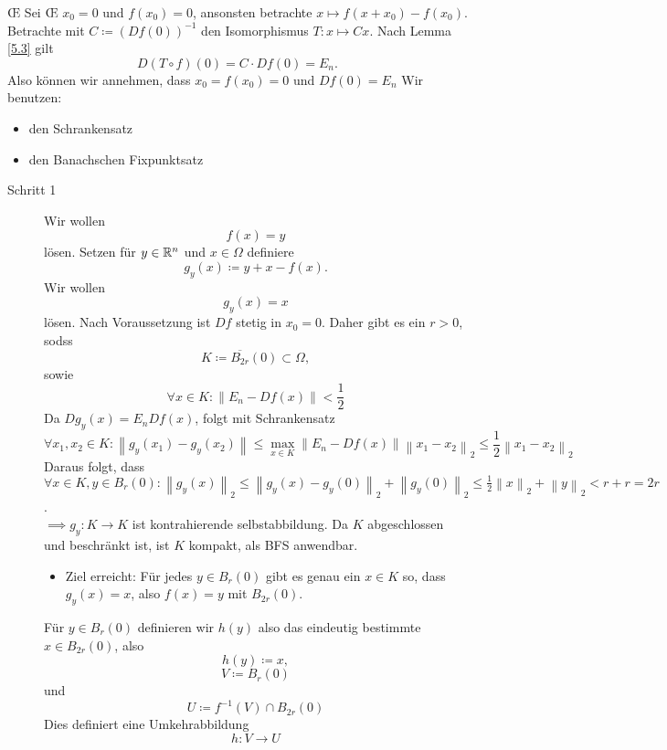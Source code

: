 \begin{proof*}
	\OE{} Sei \OE{} $ x_0 = 0 $ und $ f(x_0) = 0 $, ansonsten betrachte $ x \mapsto f\left( x + x_0 \right) - f(x_0) $.
	Betrachte mit $ C \coloneqq \left( Df(0) \right) ^{-1}  $ den Isomorphismus $ T : x \mapsto Cx $.
	Nach Lemma \ref{5.3} gilt
	\[
		D\left( T \circ f \right) \left( 0 \right) = C \cdot Df(0) = E_n.
	\]
	Also können wir annehmen, dass $ x_0 = f(x_0) = 0 $ und $ Df(0) = E_n $
	Wir benutzen:
	\begin{itemize}
		\item den Schrankensatz
		\item den Banachschen Fixpunktsatz
	\end{itemize}
	\begin{description}
		\item[Schritt 1] Wir wollen
			\[
				f(x) = y
			\]
			lösen.
			Setzen für $ y \in \mathbb{R} ^n $ und $ x \in \Omega $ 
			definiere
			\[
				g_y (x) \coloneqq y + x - f(x).
			\]
			Wir wollen
			\[
				g_y(x) = x
			\]
			lösen.
			Nach Voraussetzung ist $ Df $ stetig in $ x_0 = 0 $. Daher gibt es ein $ r> 0 $, sodss
			\[
				K \coloneqq \overline{B_{2r}}(0) \subset \Omega,
			\]
			sowie
			\[
				\forall x \in K : \left\| E_n - Df(x) \right\| < \frac{ 1 }{ 2 } 
			\]
			Da $ Dg_y(x) = E_n Df(x) $, folgt mit Schrankensatz
			\[
				\forall x_1, x_2 \in K : \left\| g_y(x_1) - g_y(x_2) \right\| \leq \max_{x \in K} \left\| E_n - Df(x) \right\| \left\| x_1 - x_2 \right\| _2 \leq  \frac{ 1 }{ 2 } \left\| x_1 - x_2 \right\| _2
			\]
			Daraus folgt, dass $ \forall x \in K, y \in B_{r}(0) : \left\| g_y (x) \right\| _2 \leq \left\| g_y(x) - g_y(0) \right\| _2 + \left\| g_y(0) \right\| _2 \leq \frac{ 1 }{ 2 } \left\| x \right\| _2 + \left\| y \right\| _2 < r + r = 2r $.\\
			$ \implies g_y : K \to K $ ist kontrahierende selbstabbildung.
			Da $ K $ abgeschlossen und beschränkt ist, ist $ K $ kompakt, als BFS anwendbar.
			\begin{itemize}
				\item Ziel erreicht: Für jedes $ y \in B_{r}(0)  $ gibt es genau ein $ x \in K $ so, dass $ g_y(x) = x $, also $ f(x) = y $ mit $ B_{2r}(0)  $.
			\end{itemize}
			Für $ y \in B_{r}(0)  $ definieren wir $ h(y) $ also das eindeutig bestimmte $ x \in B_{2r}(0)  $, also
			\[
				h(y) \coloneqq  x,
			\]
			\[
				V \coloneqq B_{r}(0) 
			\]
			und 
			\[
				U \coloneqq f^{-1} (V) \cap B_{2r}(0) 
			\]
			Dies definiert eine Umkehrabbildung
			\[
				h : V \to U
\]
\end{description}
\end{proof*}
